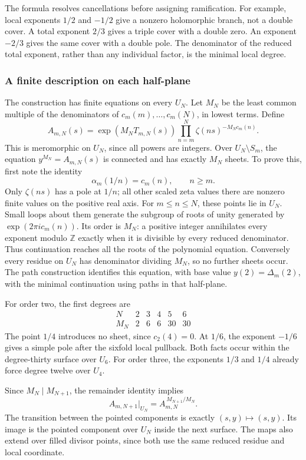 The formula resolves cancellations before assigning ramification.
For example, local exponents \(1/2\) and \(-1/2\) give a nonzero
holomorphic branch, not a double cover.  A total exponent \(2/3\)
gives a triple cover with a double zero.  An exponent \(-2/3\) gives
the same cover with a double pole.  The denominator of the reduced total
exponent, rather than any individual factor, is the minimal local degree.

\subsubsection{A finite description on each half-plane}

The construction has finite equations on every \(U_N\).
Let \(M_N\) be the least common multiple of the denominators of
\(c_m(m),\ldots,c_m(N)\), in lowest terms.  Define
\[
 A_{m,N}(s)=\exp(M_N T_{m,N}(s))
       \prod_{n=m}^N\zeta(ns)^{-M_Nc_m(n)}.
\]
This is meromorphic on \(U_N\), since all powers are integers.
Over \(U_N\setminus S_m\), the equation
\(y^{M_N}=A_{m,N}(s)\) is connected and has exactly \(M_N\) sheets.
To prove this, first note the identity
\[
 \alpha_m(1/n)=c_m(n),\qquad n\geq m.
\]
Only \(\zeta(ns)\) has a pole at \(1/n\); all other scaled zeta
values there are nonzero finite values on the positive real axis.
For \(m\leq n\leq N\), these points lie in \(U_N\).
Small loops about them generate the subgroup of roots of unity generated
by \(\exp(2\pi i c_m(n))\).  Its order is \(M_N\): a positive integer
annihilates every exponent modulo \(\mathbb Z\) exactly when it is
divisible by every reduced denominator.  Thus continuation reaches all
the roots of the polynomial equation.  Conversely every residue on
\(U_N\) has denominator dividing \(M_N\), so no further sheets occur.
The path construction identifies this equation, with base value
\(y(2)=\Delta_m(2)\), with the minimal continuation using paths in
that half-plane.

For order two, the first degrees are
\[
 \begin{array}{c|ccccc}
 N&2&3&4&5&6\\ \hline
 M_N&2&6&6&30&30
 \end{array}
\]
The point \(1/4\) introduces no sheet, since \(c_2(4)=0\).
At \(1/6\), the exponent \(-1/6\) gives a simple pole after the
sixfold local pullback.  Both facts occur within the degree-thirty surface
over \(U_6\).  For order three, the exponents \(1/3\) and \(1/4\)
already force degree twelve over \(U_4\).

Since \(M_N\mid M_{N+1}\), the remainder identity implies
\[
 A_{m,N+1}|_{U_N}=A_{m,N}^{\,M_{N+1}/M_N}.
\]
The transition between the pointed components is exactly
\((s,y)\mapsto(s,y)\).  Its image is the pointed component over
\(U_N\) inside the next surface.  The maps also extend over filled
divisor points, since both use the same reduced residue and local coordinate.

